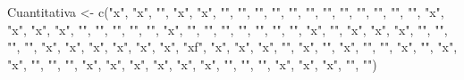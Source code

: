 \documentclass[
]{article}
\newenvironment{Shaded}{\begin{snugshade}}{\end{snugshade}}
\newcommand{\FunctionTok}[1]{\textcolor[rgb]{0.00,0.00,0.00}{#1}}
\newcommand{\NormalTok}[1]{#1}
\newcommand{\OtherTok}[1]{\textcolor[rgb]{0.56,0.35,0.01}{#1}}
\newcommand{\StringTok}[1]{\textcolor[rgb]{0.31,0.60,0.02}{#1}}
\begin{document}
\begin{Shaded}
\begin{Highlighting}[]
\NormalTok{Cuantitativa }\OtherTok{\textless{}{-}} \FunctionTok{c}\NormalTok{(}\StringTok{"x"}\NormalTok{, }\StringTok{"x"}\NormalTok{, }\StringTok{""}\NormalTok{, }\StringTok{"x"}\NormalTok{, }\StringTok{"x"}\NormalTok{, }\StringTok{""}\NormalTok{, }\StringTok{""}\NormalTok{, }\StringTok{""}\NormalTok{, }\StringTok{""}\NormalTok{, }\StringTok{""}\NormalTok{, }\StringTok{""}\NormalTok{, }\StringTok{""}\NormalTok{, }\StringTok{""}\NormalTok{, }\StringTok{""}\NormalTok{, }\StringTok{""}\NormalTok{, }\StringTok{""}\NormalTok{, }\StringTok{""}\NormalTok{, }\StringTok{"x"}\NormalTok{, }\StringTok{"x"}\NormalTok{, }\StringTok{"x"}\NormalTok{, }\StringTok{"x"}\NormalTok{, }\StringTok{""}\NormalTok{, }\StringTok{""}\NormalTok{, }\StringTok{""}\NormalTok{, }\StringTok{""}\NormalTok{, }\StringTok{""}\NormalTok{, }\StringTok{"x"}\NormalTok{, }\StringTok{""}\NormalTok{, }\StringTok{""}\NormalTok{, }\StringTok{""}\NormalTok{, }\StringTok{""}\NormalTok{, }\StringTok{""}\NormalTok{, }\StringTok{""}\NormalTok{, }\StringTok{""}\NormalTok{, }\StringTok{"x"}\NormalTok{, }\StringTok{""}\NormalTok{, }\StringTok{"x"}\NormalTok{, }\StringTok{"x"}\NormalTok{, }\StringTok{"x"}\NormalTok{, }\StringTok{""}\NormalTok{, }\StringTok{""}\NormalTok{, }\StringTok{""}\NormalTok{, }\StringTok{""}\NormalTok{, }\StringTok{"x"}\NormalTok{, }\StringTok{"x"}\NormalTok{, }\StringTok{"x"}\NormalTok{, }\StringTok{"x"}\NormalTok{, }\StringTok{"x"}\NormalTok{, }\StringTok{"x"}\NormalTok{, }\StringTok{"xf"}\NormalTok{, }\StringTok{"x"}\NormalTok{, }\StringTok{"x"}\NormalTok{, }\StringTok{"x"}\NormalTok{, }\StringTok{""}\NormalTok{, }\StringTok{"x"}\NormalTok{, }\StringTok{""}\NormalTok{, }\StringTok{"x"}\NormalTok{, }\StringTok{""}\NormalTok{, }\StringTok{""}\NormalTok{, }\StringTok{"x"}\NormalTok{, }\StringTok{""}\NormalTok{, }\StringTok{"x"}\NormalTok{, }\StringTok{"x"}\NormalTok{, }\StringTok{""}\NormalTok{, }\StringTok{""}\NormalTok{, }\StringTok{""}\NormalTok{, }\StringTok{"x"}\NormalTok{, }\StringTok{"x"}\NormalTok{, }\StringTok{"x"}\NormalTok{, }\StringTok{"x"}\NormalTok{, }\StringTok{"x"}\NormalTok{, }\StringTok{"x"}\NormalTok{, }\StringTok{""}\NormalTok{, }\StringTok{""}\NormalTok{, }\StringTok{""}\NormalTok{, }\StringTok{"x"}\NormalTok{, }\StringTok{"x"}\NormalTok{, }\StringTok{"x"}\NormalTok{, }\StringTok{""}\NormalTok{, }\StringTok{""}\NormalTok{)}


\end{Highlighting}
\end{Shaded}
\end{document}
